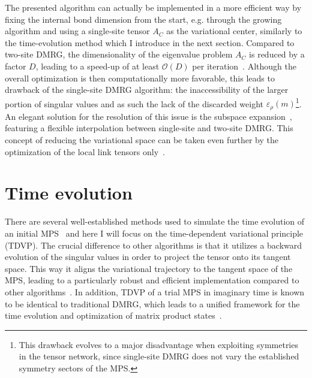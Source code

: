 The presented algorithm can actually be implemented in a more efficient way by fixing the internal bond dimension from the start, e.g. through the growing algorithm and using a single-site tensor $A_C$ as the variational center, similarly to the time-evolution method which I introduce in the next section.
Compared to two-site DMRG, the dimensionality of the eigenvalue problem $A_C$ is reduced by a factor $D$, leading to a speed-up of at least $\mathcal O(D)$ per iteration~\cite{White2005}.
Although the overall optimization is then computationally more favorable, this leads to drawback of the single-site DMRG algorithm: the inaccessibility of the larger portion of singular values and as such the lack of the discarded weight $\varepsilon_\rho(m)$\footnote{This drawback evolves to a major disadvantage when exploiting symmetries in the tensor network, since single-site DMRG does not vary the established symmetry sectors of the MPS.}.
An elegant solution for the resolution of this issue is the subspace expansion~\cite{Hubig2015}, featuring a flexible interpolation between single-site and two-site DMRG.
This concept of reducing the variational space can be taken even further by the optimization of the local link tensors only~\cite{Fernandez2020}.
%
%
\section{Time evolution}
\label{sec:time_evolution}
%
%
There are several well-established methods used to simulate the time evolution of an initial MPS~\cite{Paeckel2019} and here I will focus on the time-dependent variational principle (TDVP).
The crucial difference to other algorithms is that it utilizes a backward evolution of the singular values in order to project the tensor onto its tangent space.
This way it aligns the variational trajectory to the tangent space of the MPS, leading to a particularly robust and efficient implementation compared to other algorithms~\cite{Haegeman2011}.
In addition, TDVP of a trial MPS in imaginary time is known to be identical to traditional DMRG, which leads to a unified framework for the time evolution and optimization of matrix product states~\cite{Haegeman2016}.

